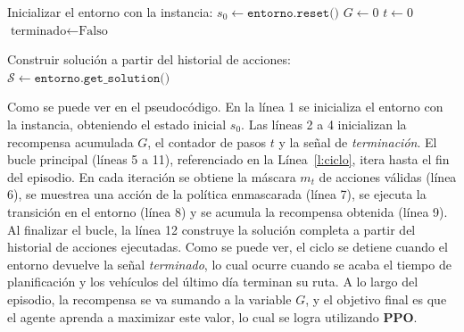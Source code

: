 \IncMargin{1.6em}
    \begin{algorithm}[H]
        \caption{Construcción de una solución del PVRP por el agente RL}
        \label{alg:ciclo-agente}
        
        
        Inicializar el entorno con la instancia: $s_0 \leftarrow \texttt{entorno.reset()}$\;
        $G \leftarrow 0$\;
        $t \leftarrow 0$\;
        $\text{terminado} \leftarrow \text{Falso}$\;
        
        
        Construir solución a partir del historial de acciones: $\mathcal{S} \leftarrow \texttt{entorno.get\_solution()}$\;
    \end{algorithm}
\DecMargin{1.6em}

Como se puede ver en el pseudocódigo. En la línea 1 se inicializa el entorno con la instancia, obteniendo el estado inicial $s_0$. Las líneas 2 a 4 inicializan la recompensa acumulada $G$, el contador de pasos $t$ y la señal de \textit{terminación}. El bucle principal (líneas 5 a 11), referenciado en la Línea~\ref{l:ciclo}, itera hasta el fin del episodio. En cada iteración se obtiene la máscara $m_t$ de acciones válidas (línea 6), se muestrea una acción de la política enmascarada (línea 7), se ejecuta la transición en el entorno (línea 8) y se acumula la recompensa obtenida (línea 9). Al finalizar el bucle, la línea 12 construye la solución completa a partir del historial de acciones ejecutadas.  Como se puede ver, el ciclo se detiene cuando el entorno devuelve la señal \textit{terminado}, lo cual ocurre cuando se acaba el tiempo de planificación y los vehículos del último día terminan su ruta. A lo largo del episodio, la recompensa se va sumando a la variable $G$, y el objetivo final es que el agente aprenda a maximizar este valor, lo cual se logra utilizando \textbf{PPO}. 

